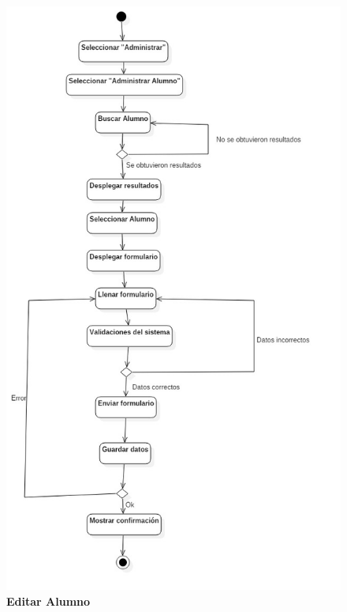 \begin{figure}[H]
  \centering
    \includegraphics[scale=.6,angle=0]{project/Actividades/Editar_Alumno.jpg}
  \caption{\textbf{Editar Alumno}}
\end{figure}
